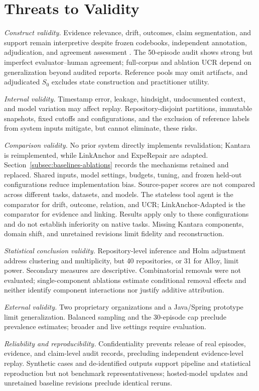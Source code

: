 \documentclass[10pt,conference]{IEEEtran}
\begin{document}
\section{Threats to Validity}
\label{sec:threats}
\noindent\textit{Construct validity.} Evidence relevance, drift, outcomes, claim segmentation, and support remain interpretive despite frozen codebooks, independent annotation, adjudication, and agreement assessment \cite{Krippendorff2018ContentAnalysis}. The 50-episode audit shows strong but imperfect evaluator--human agreement; full-corpus and ablation UCR depend on generalization beyond audited reports. Reference pools may omit artifacts, and adjudicated $S_0$ excludes state construction and practitioner utility.\par\noindent\textit{Internal validity.} Timestamp error, leakage, hindsight, undocumented context, and model variation may affect replay. Repository-disjoint partitions, immutable snapshots, fixed cutoffs and configurations, and the exclusion of reference labels from system inputs mitigate, but cannot eliminate, these risks. \par\noindent\textit{Comparison validity.} No prior system directly implements revalidation; Kantara is reimplemented, while LinkAnchor and ExpeRepair are adapted. Section~\ref{subsec:baselines-ablations} records the mechanisms retained and replaced. Shared inputs, model settings, budgets, tuning, and frozen held-out configurations reduce implementation bias. Source-paper scores are not compared across different tasks, datasets, and models. The stateless tool agent is the comparator for drift, outcome, relation, and UCR; LinkAnchor-Adapted is the comparator for evidence and linking. Results apply only to these configurations and do not establish inferiority on native tasks. Missing Kantara components, domain shift, and unretained revisions limit fidelity and reconstruction. \par\noindent\textit{Statistical conclusion validity.} Repository-level inference and Holm adjustment address clustering and multiplicity, but 40 repositories, or 31 for Alloy, limit power. Secondary measures are descriptive. Combinatorial removals were not evaluated; single-component ablations estimate conditional removal effects and neither identify component interactions nor justify additive attribution. \par\noindent\textit{External validity.} Two proprietary organizations and a Java/Spring prototype limit generalization. Balanced sampling and the 30-episode cap preclude prevalence estimates; broader and live settings require evaluation. \par\noindent\textit{Reliability and reproducibility.} Confidentiality prevents release of real episodes, evidence, and claim-level audit records, precluding independent evidence-level replay. Synthetic cases and de-identified outputs support pipeline and statistical reproduction but not benchmark representativeness; hosted-model updates and unretained baseline revisions preclude identical reruns.
\end{document}

